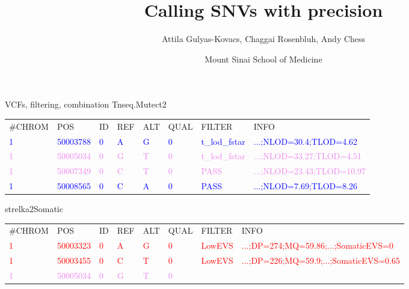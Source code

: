 \documentclass{beamer}
\title{Calling SNVs with precision}
\author{Attila Gulyas-Kovacs, Chaggai Rosenbluh, Andy Chess}
\date{Mount Sinai School of Medicine}
\begin{document}
\maketitle

\begin{frame}{VCFs, filtering, combination}
\normalsize
Tnseq.Mutect2
\tiny
\begin{tabular}{llllllll}
\#CHROM & POS & ID & REF & ALT & QUAL & FILTER & INFO \\
\textcolor{blue}{1} &
\textcolor{blue}{50003788} &
\textcolor{blue}{0} &
\textcolor{blue}{A} &
\textcolor{blue}{G} &
\textcolor{blue}{0} &
\textcolor{blue}{t\_lod\_fstar} &
\textcolor{blue}{...;NLOD=30.4;TLOD=4.62} \\
\textcolor{violet}{1} &
\textcolor{violet}{50005034} &
\textcolor{violet}{0} &
\textcolor{violet}{G} &
\textcolor{violet}{T} &
\textcolor{violet}{0} &
\textcolor{violet}{t\_lod\_fstar} &
\textcolor{violet}{...;NLOD=33.27;TLOD=4.51} \\
\textcolor{violet}{1} &
\textcolor{violet}{50007349} &
\textcolor{violet}{0} &
\textcolor{violet}{C} &
\textcolor{violet}{T} &
\textcolor{violet}{0} &
\textcolor{violet}{PASS} &
\textcolor{violet}{...;NLOD=23.43;TLOD=10.97} \\
\textcolor{blue}{1} &
\textcolor{blue}{50008565} &
\textcolor{blue}{0} &
\textcolor{blue}{C} &
\textcolor{blue}{A} &
\textcolor{blue}{0} &
\textcolor{blue}{PASS} &
\textcolor{blue}{...;NLOD=7.69;TLOD=8.26} \\
\end{tabular}
\vfill
\normalsize
strelka2Somatic
\tiny
\begin{tabular}{llllllll}
\#CHROM & POS & ID & REF & ALT & QUAL & FILTER & INFO \\
\textcolor{red}{1} &
\textcolor{red}{50003323} &
\textcolor{red}{0} &
\textcolor{red}{A} &
\textcolor{red}{G} &
\textcolor{red}{0} &
\textcolor{red}{LowEVS} &
\textcolor{red}{...;DP=274;MQ=59.86;...;SomaticEVS=0} \\
\textcolor{red}{1} &
\textcolor{red}{50003455} &
\textcolor{red}{0} &
\textcolor{red}{C} &
\textcolor{red}{T} &
\textcolor{red}{0} &
\textcolor{red}{LowEVS} &
\textcolor{red}{...;DP=226;MQ=59.9;...;SomaticEVS=0.65} \\
\textcolor{violet}{1} &
\textcolor{violet}{50005034} &
\textcolor{violet}{0} &
\textcolor{violet}{G} &
\textcolor{violet}{T} &
\textcolor{violet}{0} &

\end{tabular}
\end{frame}
\end{document}
